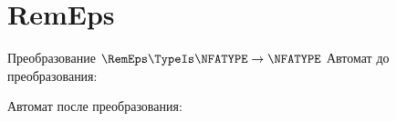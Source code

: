 \section{RemEps}
\begin{frame}{Преобразование $\RemEps\TypeIs\NFATYPE\to\NFATYPE$}
	Автомат до преобразования:


	Автомат после преобразования:


\end{frame}